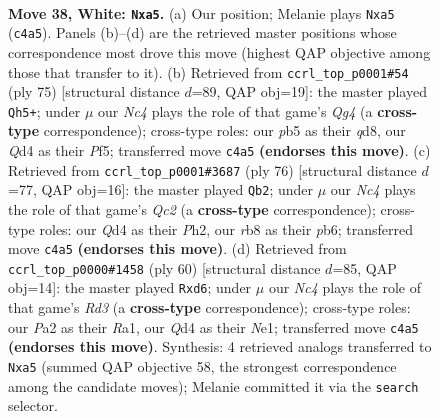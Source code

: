 \documentclass[11pt]{article}
\begin{document}
\clearpage

\begin{figure}[p]\centering
\begin{subfigure}{0.46\textwidth}\centering
\resizebox{\linewidth}{!}{%
\newchessgame
\chessboard[
  setfen={1r4k1/1r5p/8/pp6/2NQ3P/8/PP3PP1/3R1K2 w - - 0 38},
  showmover=false,
  pgfstyle=straightmove, color=movearrow, markmove={c4-a5}
]}
\caption{}
\end{subfigure}\hfill
\begin{subfigure}{0.46\textwidth}\centering
\resizebox{\linewidth}{!}{%
\newchessgame
\chessboard[
  setfen={3Q4/6pk/7p/5pq1/8/P2R1P1K/5P1P/2r5 b - - 10 38},
  showmover=false,
  pgfstyle=straightmove, color=movearrow, markmove={g5-h5}
]}
\caption{}
\end{subfigure}
\\[4pt]
\begin{subfigure}{0.46\textwidth}\centering
\resizebox{\linewidth}{!}{%
\newchessgame
\chessboard[
  setfen={q7/6pk/1pr1p2p/8/4P3/1P2P1P1/2Q2RKP/8 w - - 7 39},
  showmover=false,
  pgfstyle=straightmove, color=movearrow, markmove={c2-b2}
]}
\caption{}
\end{subfigure}\hfill
\begin{subfigure}{0.46\textwidth}\centering
\resizebox{\linewidth}{!}{%
\newchessgame
\chessboard[
  setfen={3r2k1/7p/3r1pp1/8/b7/P2R4/5PPP/R3N1K1 w - - 1 31},
  showmover=false,
  pgfstyle=straightmove, color=movearrow, markmove={d3-d6}
]}
\caption{}
\end{subfigure}
\caption{\textbf{Move 38, White: \texttt{Nxa5}.} (a) Our position; Melanie plays \texttt{Nxa5} (\texttt{c4a5}). Panels (b)--(d) are the retrieved master positions whose correspondence most drove this move (highest QAP objective among those that transfer to it). (b) Retrieved from \texttt{ccrl\_top\_p0001\#54} (ply 75) [structural distance $d$=89, QAP obj=19]: the master played \texttt{Qh5+}; under $\mu$ our \emph{Nc4} plays the role of that game's \emph{Qg4} (a \textbf{cross-type} correspondence); cross-type roles: our \emph{p}b5 as their \emph{q}d8, our \emph{Q}d4 as their \emph{P}f5; transferred move \texttt{c4a5} \textbf{(endorses this move)}. (c) Retrieved from \texttt{ccrl\_top\_p0001\#3687} (ply 76) [structural distance $d$=77, QAP obj=16]: the master played \texttt{Qb2}; under $\mu$ our \emph{Nc4} plays the role of that game's \emph{Qc2} (a \textbf{cross-type} correspondence); cross-type roles: our \emph{Q}d4 as their \emph{P}h2, our \emph{r}b8 as their \emph{p}b6; transferred move \texttt{c4a5} \textbf{(endorses this move)}. (d) Retrieved from \texttt{ccrl\_top\_p0000\#1458} (ply 60) [structural distance $d$=85, QAP obj=14]: the master played \texttt{Rxd6}; under $\mu$ our \emph{Nc4} plays the role of that game's \emph{Rd3} (a \textbf{cross-type} correspondence); cross-type roles: our \emph{P}a2 as their \emph{R}a1, our \emph{Q}d4 as their \emph{N}e1; transferred move \texttt{c4a5} \textbf{(endorses this move)}. Synthesis: 4 retrieved analogs transferred to \texttt{Nxa5} (summed QAP objective 58, the strongest correspondence among the candidate moves); Melanie committed it via the \texttt{search} selector.}
\label{fig:thought-m74}
\end{figure}
\end{document}
